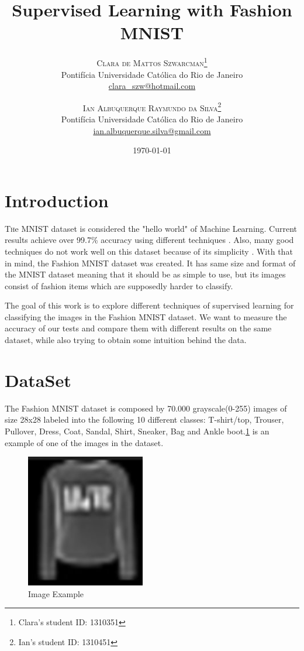 \documentclass{article}
\title{Supervised Learning with Fashion MNIST} %
\author{%
\textsc{Clara de Mattos Szwarcman}\thanks{Clara's student ID: 1310351} \\[1ex] %
\normalsize Pontifícia Universidade Católica do Rio de Janeiro \\ %
\normalsize \href{mailto:clara_szw@hotmail.com}{clara\_szw@hotmail.com} %
\and %
\textsc{Ian Albuquerque Raymundo da Silva}\thanks{Ian's student ID: 1310451} \\[1ex] %
\normalsize Pontifícia Universidade Católica do Rio de Janeiro \\ %
\normalsize \href{mailto:ian.albuquerque.silva@gmail.com}{ian.albuquerque.silva@gmail.com} %
}
\date{\today} %
\begin{document}
\maketitle


\section{Introduction}

\lettrine[nindent=0em,lines=3]{T} he MNIST dataset is considered the "hello world" of Machine Learning.
Current results achieve over 99.7\% accuracy using different techniques
\cite{LWan:2013dg} \cite{DCirean:2012dg} \cite{ISato:2015dg} \cite{JRChang:2015dg} \cite{CYLee:2015dg}.
Also, many good techniques do not work well on this dataset because of its simplicity \cite{CFran:2017dg}.
With that in mind, the Fashion MNIST dataset \cite{FashionMNIST} was created. It has same size and format
of the MNIST dataset meaning that
it should be as simple to use, but its images consist of fashion items which are supposedly harder to
classify.

The goal of this work is to explore different techniques of supervised learning for classifying the images
in the Fashion MNIST dataset. We want to measure the accuracy of our tests and compare them with different
results on the same dataset, while also trying to obtain some intuition behind the data.\


\section{DataSet}

	The Fashion MNIST dataset is composed by 70.000 grayscale(0-255) images of size 28x28 labeled into the following 10 different classes: T-shirt/top, Trouser, Pullover, Dress, Coat, Sandal, Shirt, Sneaker, Bag and Ankle boot.\ref{fig:fashionex} is an example of one of the images in the dataset.
	
	\begin{figure}[h]
    \begin{center}
        \includegraphics[scale=0.8]{fashionExample.png}
        \caption{Image Example\label{fig:fashionex}}
    \end{center}
    \end{figure}
    
\end{document}
